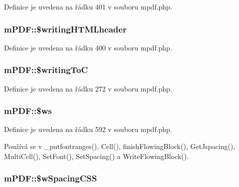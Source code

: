 Definice je uvedena na řádku 401 v souboru mpdf.\-php.

\hypertarget{classm_p_d_f_a1b327332d853eefc157239bdaa77d15b}{
\subsubsection[{\$writing\-H\-T\-M\-Lheader}]{\setlength{\rightskip}{0pt plus 5cm}m\-P\-D\-F\-::\$writing\-H\-T\-M\-Lheader}}\label{classm_p_d_f_a1b327332d853eefc157239bdaa77d15b}


Definice je uvedena na řádku 400 v souboru mpdf.\-php.

\hypertarget{classm_p_d_f_a24102469f1891912d16b74c02cf95d5a}{
\subsubsection[{\$writing\-To\-C}]{\setlength{\rightskip}{0pt plus 5cm}m\-P\-D\-F\-::\$writing\-To\-C}}\label{classm_p_d_f_a24102469f1891912d16b74c02cf95d5a}


Definice je uvedena na řádku 272 v souboru mpdf.\-php.

\hypertarget{classm_p_d_f_a91b8aeed5de9540eda4c82acc3d5737c}{
\subsubsection[{\$ws}]{\setlength{\rightskip}{0pt plus 5cm}m\-P\-D\-F\-::\$ws}}\label{classm_p_d_f_a91b8aeed5de9540eda4c82acc3d5737c}


Definice je uvedena na řádku 592 v souboru mpdf.\-php.



Používá se v \-\_\-putfontranges(), Cell(), finish\-Flowing\-Block(), Get\-Jspacing(), Multi\-Cell(), Set\-Font(), Set\-Spacing() a Write\-Flowing\-Block().

\hypertarget{classm_p_d_f_ae8e2a24321e5b9ce7716ca4c7178dd4e}{
\subsubsection[{\$w\-Spacing\-C\-S\-S}]{\setlength{\rightskip}{0pt plus 5cm}m\-P\-D\-F\-::\$w\-Spacing\-C\-S\-S}}\label{classm_p_d_f_ae8e2a24321e5b9ce7716ca4c7178dd4e}


